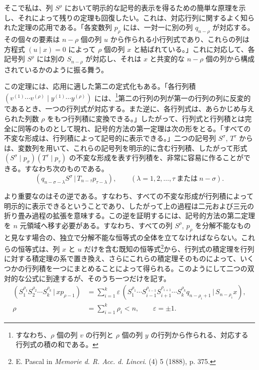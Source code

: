 \documentclass[11pt]{article}
\newcommand{\pair}[2]{(#1\,|\,#2)}
\newcommand{\eps}{\varepsilon}
\begin{document}
そこで私は、列 $S^\rho$ において明示的な記号的表示を得るための簡単な原理を示し、それによって残りの定理も回復したい。これは、対応行列に関するよく知られた定理の応用である。「各変数列 $p_\rho$ には、一対一に別の列 $q_{n-\rho}$ が対応する。その個々の要素は $n-\rho$ 個の列 $u$ から作られる小行列式であり、これらの列は方程式 $(u\mid x)=0$ によって $\rho$ 個の列 $x$ と結ばれている。」これに対応して、各記号列 $S^\rho$ には別の $S_{n-\rho}$ が対応し、それは $x$ と共変的な $n-\rho$ 個の列から構成されているかのように振る舞う。

この定理には、応用に適した第二の定式化もある。「各行列積 $(v^{(1)}\cdots v^{(\rho)}\mid y^{(1)}\cdots y^{(\rho)})$ には、\footnote{すなわち、$\rho$ 個の列 $v$ の行列と $\rho$ 個の列 $y$ の行列から作られる、対応する行列式の積の和である。}第二の行列の列が第一の行列の列に反変的であるとき、一つの行列式が対応する。また逆に、各行列式は、あらかじめ与えられた列数 $\rho$ をもつ行列積に変換できる。」したがって、行列式と行列積とは完全に同等のものとして現れ、記号的方法の第一定理は次の形をとる。「すべての不変な形成は、行列積によって記号的に表示できる。」二つの記号列 $S^\sigma$, $T^\tau$ からは、変数列を用いて、これらの記号列を明示的に含む行列積、したがって形式 $(S^\sigma\mid p_\sigma)(T^\tau\mid p_\tau)$ の不変な形成を表す行列積を、非常に容易に作ることができる。すなわち次のものである。
\begin{equation}
 \pair{q_{n-\sigma-\lambda}S^\sigma}{T_{n-\tau}p_{\tau-\lambda}},
 \qquad (\lambda=1,2,\ldots,\tau\ \text{または}\ n-\sigma).
\tag{1}
\end{equation}

より重要なのはその逆である。すなわち、すべての不変な形成が行列積によって明示的に表示できるということであり、したがって上の過程は二元および三元の折り畳み過程の拡張を意味する。この逆を証明するには、記号的方法の第二定理を $n$ 元領域へ移す必要がある。すなわち、すべての列 $S^\rho$, $p_\rho$ を分解不能なものと見なす場合の、独立で分解不能な恒等式の全体を立てなければならない。これらの恒等式は、列 $x$ と $u$ だけを含む既知の恒等式\footnote{E. Pascal in \emph{Memorie d. R. Acc. d. Lincei}. (4) 5 (1888), p. 375.}から、行列式の積定理を行列に対する積定理の系で置き換え、さらにこれらの積定理そのものによって、いくつかの行列積を一つにまとめることによって得られる。このようにして二つの双対的な公式に到達するが、そのうち一つだけを記す。
\begin{equation}
\begin{aligned}
 \pair{S_1^{\rho_1}S_2^{\rho_2}\cdots S_k^{\rho_k}}{x p_{\rho-1}}
 &=\sum_{i=1}^{k}\eps\,\pair{S_1^{\rho_1}\cdots S_{i-1}^{\rho_{i-1}}S_{i+1}^{\rho_{i+1}}\cdots S_k^{\rho_k}q_{n-\rho_i+1}}{S_{n-\rho_i}x},\\
 \rho&=\sum_{i=1}^{k}\rho_i<n,\qquad \eps=\pm1.
\end{aligned}
\tag{2}
\end{equation}
\end{document}
